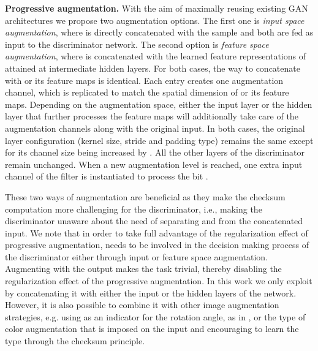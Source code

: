 \documentclass{article}
\begin{document}
\textbf{Progressive augmentation.}\label{subsec:network-implement}
With the aim of maximally reusing existing GAN architectures we propose two augmentation options. The first one is \emph{input space augmentation}, where  is directly concatenated with the sample  and both are fed as input to the discriminator network. The second option is \emph{feature space augmentation},  where  is concatenated with the learned feature representations of  attained at intermediate hidden layers. For both cases, the way to concatenate  with  or its feature maps is identical.
Each entry  creates one augmentation channel, which is replicated to match the spatial dimension of  or its feature maps. Depending on the augmentation space, either the input layer or the hidden layer that further processes the feature maps will additionally take care of the augmentation channels along with the original input. In both cases, the original layer configuration (kernel size, stride and padding type) remains the same except for its channel size being increased by . All the other layers of the discriminator remain unchanged. When a new augmentation level is reached, one extra input channel of the filter is instantiated to process the bit . 

These two ways of augmentation are beneficial as they make the checksum computation more challenging for the discriminator, i.e., making the discriminator unaware about the need of separating  and  from the concatenated input. 
We note that in order to take full advantage of the regularization effect of progressive augmentation,  needs to be involved in the decision making process of the discriminator either through input or feature space augmentation. Augmenting  with the output  makes the task trivial, thereby disabling the regularization effect of the progressive augmentation.
In this work we only exploit  by concatenating it with either the input or the hidden layers of the network. However, it is also possible to combine it with other image augmentation strategies, e.g. using  as an indicator for the rotation angle, as in \cite{ChenSS2019}, or the type of color augmentation that is imposed on the input  and encouraging  to learn the type through the checksum principle.
\end{document}
